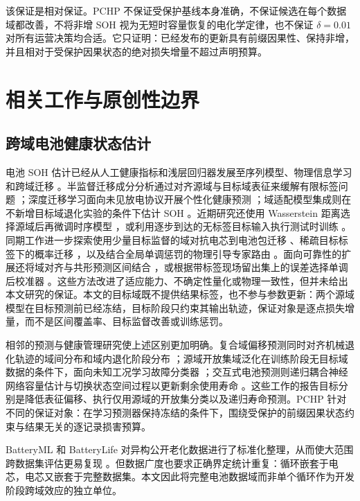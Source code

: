 \documentclass[UTF8,11pt]{ctexart}
\begin{document}
该保证是相对保证。PCHP 不保证受保护基线本身准确，不保证候选在每个数据域都改善，不将非增 SOH 视为无短时容量恢复的电化学定律，也不保证 $\delta=0.01$ 对所有运营决策均合适。它只证明：已经发布的更新具有前缀因果性、保持非增，并且相对于受保护因果状态的绝对损失增量不超过声明预算。

\section{相关工作与原创性边界}

\subsection{跨域电池健康状态估计}

电池 SOH 估计已经从人工健康指标和浅层回归器发展至序列模型、物理信息学习和跨域迁移 \citep{ng2020mlbattery,roman2021pipeline,wang2024pinn}。半监督迁移成分分析通过对齐源域与目标域表征来缓解有限标签问题 \citep{li2020sstca}；深度迁移学习面向未见放电协议开展个性化健康预测 \citep{ma2022personalized}；域适配模型集成则在不新增目标域退化实验的条件下估计 SOH \citep{lu2023without}。近期研究还使用 Wasserstein 距离选择源域后再微调时序模型 \citep{duan2025wasserstein}，或利用逐步到达的无标签目标输入执行测试时训练 \citep{feng2024batteryttt}。同期工作进一步探索使用少量目标监督的域对抗电芯到电池包迁移 \citep{shu2026celltopack}、稀疏目标标签下的概率迁移 \citep{shao2026probabilistic}，以及结合全局单调惩罚的物理引导专家路由 \citep{jiang2026phasemoe}。面向可靠性的扩展还将域对齐与共形预测区间结合 \citep{filgueira2026conformalized}，或根据带标签现场留出集上的误差选择单调后校准器 \citep{nyachionjeka2026safecalibrated}。这些方法改进了适应能力、不确定性量化或物理一致性，但并未给出本文研究的保证。本文的目标域既不提供结果标签，也不参与参数更新：两个源域模型在目标预测前已经冻结，目标阶段只约束其输出轨迹，保证对象是逐点损失增量，而不是区间覆盖率、目标监督改善或训练惩罚。

相邻的预测与健康管理研究使上述区别更加明确。复合域偏移预测同时对齐机械退化轨迹的域间分布和域内退化阶段分布 \citep{ding2023compound}；源域开放集域泛化在训练阶段无目标域数据的条件下，面向未知工况学习故障分类器 \citep{song2026regroupment}；交互式电池预测则递归耦合神经网络容量估计与切换状态空间过程以更新剩余使用寿命 \citep{duan2025interactive}。这些工作的报告目标分别是降低表征偏移、执行仅用源域的开放集分类以及递归寿命预测。PCHP 针对不同的保证对象：在学习预测器保持冻结的条件下，围绕受保护的前缀因果状态约束与结果无关的逐记录损害预算。

BatteryML 和 BatteryLife 对异构公开老化数据进行了标准化整理，从而使大范围跨数据集评估更易复现 \citep{zhang2024batteryml,tan2025batterylife}。但数据广度也要求正确界定统计重复：循环嵌套于电芯，电芯又嵌套于完整数据集。本文因此将完整电池数据域而非单个循环作为开发阶段跨域效应的独立单位。
\end{document}
